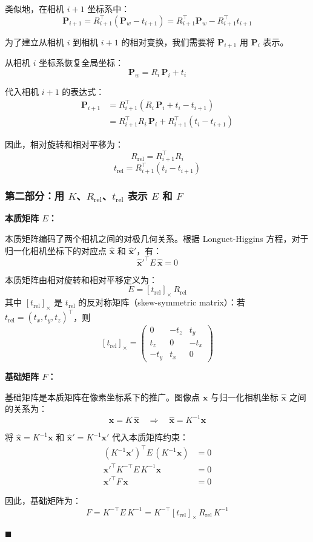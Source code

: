 \documentclass[12pt, a4paper]{article}
\begin{document}
类似地，在相机 $i+1$ 坐标系中：
\[
\mathbf{P}_{i+1} = R_{i+1}^{\top} (\mathbf{P}_w - t_{i+1}) = R_{i+1}^{\top} \mathbf{P}_w - R_{i+1}^{\top} t_{i+1}
\]

为了建立从相机 $i$ 到相机 $i+1$ 的相对变换，我们需要将 $\mathbf{P}_{i+1}$ 用 $\mathbf{P}_i$ 表示。

从相机 $i$ 坐标系恢复全局坐标：
\[
\mathbf{P}_w = R_i \, \mathbf{P}_i + t_i
\]

代入相机 $i+1$ 的表达式：
\begin{align}
\mathbf{P}_{i+1} &= R_{i+1}^{\top} (R_i \, \mathbf{P}_i + t_i - t_{i+1}) \nonumber \\
&= R_{i+1}^{\top} R_i \, \mathbf{P}_i + R_{i+1}^{\top} (t_i - t_{i+1})
\end{align}

因此，相对旋转和相对平移为：
\[
\boxed{R_{\text{rel}} = R_{i+1}^{\top} R_i}
\]
\[
\boxed{t_{\text{rel}} = R_{i+1}^{\top} (t_i - t_{i+1})}
\]

\subsubsection*{第二部分：用 $K$、$R_{\text{rel}}$、$t_{\text{rel}}$ 表示 $E$ 和 $F$}

\textbf{本质矩阵 $E$：}

本质矩阵编码了两个相机之间的对极几何关系。根据 Longuet-Higgins 方程，对于归一化相机坐标下的对应点 $\hat{\mathbf{x}}$ 和 $\hat{\mathbf{x}}'$，有：
\[
\hat{\mathbf{x}}'^{\top} E \, \hat{\mathbf{x}} = 0
\]

本质矩阵由相对旋转和相对平移定义为：
\[
\boxed{E = [t_{\text{rel}}]_{\times} \, R_{\text{rel}}}
\]
其中 $[t_{\text{rel}}]_{\times}$ 是 $t_{\text{rel}}$ 的反对称矩阵（skew-symmetric matrix）：若 $t_{\text{rel}} = (t_x, t_y, t_z)^{\top}$，则
\[
[t_{\text{rel}}]_{\times} = \begin{pmatrix}
0 & -t_z & t_y \\
t_z & 0 & -t_x \\
-t_y & t_x & 0
\end{pmatrix}
\]

\textbf{基础矩阵 $F$：}

基础矩阵是本质矩阵在像素坐标系下的推广。图像点 $\mathbf{x}$ 与归一化相机坐标 $\hat{\mathbf{x}}$ 之间的关系为：
\[
\mathbf{x} = K \, \hat{\mathbf{x}} \quad \Longrightarrow \quad \hat{\mathbf{x}} = K^{-1} \mathbf{x}
\]

将 $\hat{\mathbf{x}} = K^{-1} \mathbf{x}$ 和 $\hat{\mathbf{x}}' = K^{-1} \mathbf{x}'$ 代入本质矩阵约束：
\begin{align}
(K^{-1} \mathbf{x}')^{\top} E \, (K^{-1} \mathbf{x}) &= 0 \nonumber \\
\mathbf{x}'^{\top} K^{-\top} E \, K^{-1} \mathbf{x} &= 0 \nonumber \\
\mathbf{x}'^{\top} F \, \mathbf{x} &= 0
\end{align}

因此，基础矩阵为：
\[
\boxed{F = K^{-\top} E \, K^{-1} = K^{-\top} [t_{\text{rel}}]_{\times} \, R_{\text{rel}} \, K^{-1}}
\]

\hfill $\blacksquare$
\end{document}
